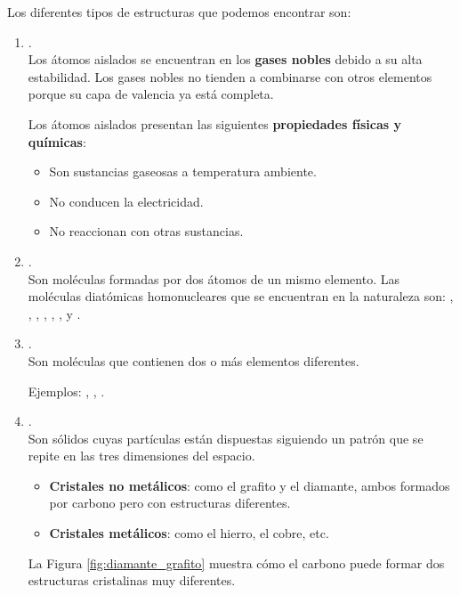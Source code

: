 Los diferentes tipos de estructuras que podemos encontrar son:
\begin{enumerate}[label=\numberballmDarkTeal]
        \item {}. \\
        Los átomos aislados se encuentran en los \textbf{gases nobles} debido a su alta estabilidad.
        Los gases nobles no tienden a combinarse con otros elementos porque su capa de valencia ya está completa.

        Los átomos aislados presentan las siguientes \textbf{propiedades físicas y químicas}:
        \begin{itemize}
            \item Son sustancias gaseosas a temperatura ambiente.
            \item No conducen la electricidad.
            \item No reaccionan con otras sustancias.
        \end{itemize}

        \item {}. \\
        Son moléculas formadas por dos átomos de un mismo elemento.
        Las moléculas diatómicas homonucleares que se encuentran en la naturaleza son:
        , , , , , , y .

        \item {}. \\
        Son moléculas que contienen dos o más elementos diferentes.

        Ejemplos: , , .

        \item {}. \\
        Son sólidos cuyas partículas están dispuestas siguiendo un patrón que se repite en las tres dimensiones del espacio.
        \begin{itemize}
            \item \textbf{Cristales no metálicos}: como el grafito y el diamante, ambos formados por carbono pero con estructuras diferentes.
            \item \textbf{Cristales metálicos}: como el hierro, el cobre, etc.
        \end{itemize}

        La Figura \eqref{fig:diamante_grafito} muestra cómo el carbono puede formar dos estructuras cristalinas muy diferentes.


\end{enumerate}
